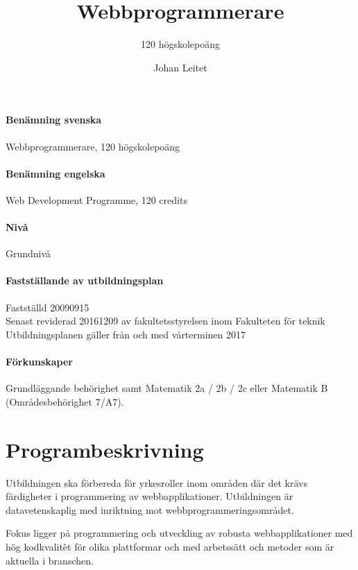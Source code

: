 \documentclass[swedish]{LnuCmThesis}
\title{Webbprogrammerare}
\subtitle{120 högskolepoäng}
\author{Johan Leitet}
\begin{document}
\maketitle

\paragraph{Benämning svenska}

Webbprogrammerare, 120 högskolepoäng

\paragraph{Benämning engelska}

Web Development Programme, 120 credits

\paragraph{Nivå}

Grundnivå

\paragraph{Fastställande av utbildningsplan}

Fastställd 2009­09­15\\
Senast reviderad 2016­12­09 av fakultetsstyrelsen inom Fakulteten för teknik\\
Utbildningsplanen gäller från och med vårterminen 2017

\paragraph{Förkunskaper}

Grundläggande behörighet samt Matematik 2a / 2b / 2c eller Matematik B\\
(Områdesbehörighet 7/A7).

\section*{Programbeskrivning}

Utbildningen ska förbereda för yrkesroller inom områden där det krävs färdigheter i
programmering av webbapplikationer. Utbildningen är datavetenskaplig med inriktning
mot webbprogrammeringsområdet.

Fokus ligger på programmering och utveckling av robusta webbapplikationer med hög
kodkvalitèt för olika plattformar och med arbetssätt och metoder som är aktuella i
branschen.
\end{document}
